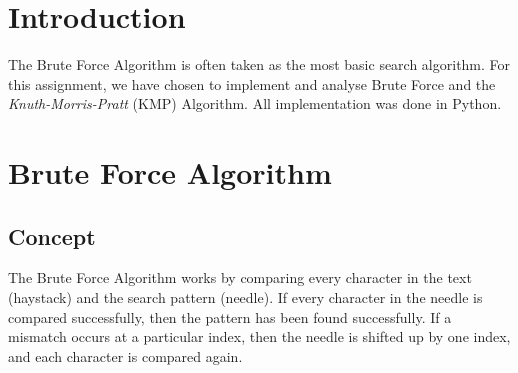 
\section*{Introduction}
The Brute Force Algorithm is often taken as the most basic search algorithm. For this assignment, we have chosen to implement and analyse Brute Force and the \emph{Knuth-Morris-Pratt} (KMP) Algorithm. All implementation was done in Python.

\section*{Brute Force Algorithm}

\subsection*{Concept}
The Brute Force Algorithm works by comparing every character in the text (haystack) and the search pattern (needle). If every character in the needle is compared successfully, then the pattern has been found successfully. If a mismatch occurs at a particular index, then the needle is shifted up by one index, and each character is compared again. 

